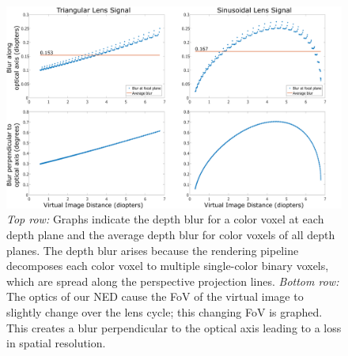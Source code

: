 \begin{figure}[tb!]
\centering
\includegraphics[width=\columnwidth]{images/volumetric/blur_graphs}
\caption[Volumetric NED: Longitudinal and lateral blur of voxels at each depth plane]{\emph{Top row: }Graphs indicate the depth blur for a color voxel at each depth plane and the average depth blur for color voxels of all depth planes. The depth blur arises because the rendering pipeline decomposes each color voxel to multiple single-color binary voxels, which are spread along the perspective projection lines. \emph{Bottom row: } The optics of our NED cause the FoV of the virtual image to slightly change over the lens cycle; this changing FoV is graphed. This creates a blur perpendicular to the optical axis leading to a loss in spatial resolution.}
\label{fig:volumetric:blur_graphs}
\end{figure}
    
    
